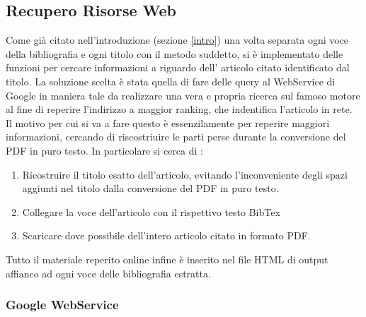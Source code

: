 \subsection{Recupero Risorse Web}

Come già citato nell'introduzione (sezione \ref{intro}) una volta separata ogni voce della bibliografia e ogni titolo con il metodo suddetto, si è implementato delle funzioni per cercare informazioni a riguardo dell' articolo citato identificato dal titolo. La soluzione scelta è stata quella di fare delle query al WebService di Google in maniera tale da realizzare una vera e propria ricerca sul famoso motore al fine di reperire l'indirizzo a maggior ranking, che indentifica l'articolo in rete.\\
Il motivo per cui si va a fare questo è essenzilamente per reperire maggiori informazioni, cercando di riscostriuire le parti perse durante la conversione del PDF in puro testo. In particolare si cerca di :
\begin{enumerate}
	\item Ricostruire il titolo esatto dell'articolo, evitando l'inconveniente degli spazi aggiunti nel titolo dalla conversione del PDF in puro testo.
	\item Collegare la voce dell'articolo con il rispettivo testo BibTex
	\item Scaricare dove possibile dell'intero articolo citato in formato PDF.
\end{enumerate}

Tutto il materiale reperito online infine è inserito nel file HTML di output affianco ad ogni voce delle bibliografia estratta.\\

\subsubsection{Google WebService}


